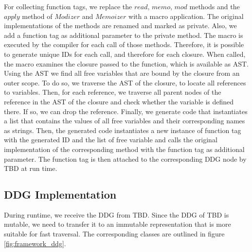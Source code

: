 For collecting function tags, we replace the $read$, $memo$, $mod$ methods and the $apply$ method of $Modizer$ and $Memoizer$ with a macro application. The original implementations of the methods are renamed and marked as private. Also, we add a function tag as additional parameter to the private method. The macro is executed by the compiler for each call of those methods. Therefore, it is possible to generate unique IDs for each call, and therefore for each closure. When called, the macro examines the closure passed to the function, which is available as AST. Using the AST we find all free variables that are bound by the closure from an outer scope. To do so, we traverse the AST of the closure, to locate all references to variables. Then, for each reference, we traverse all parent nodes of the reference in the AST of the closure and check whether the variable is defined there. If so, we can drop the reference. Finally, we generate code that instantiates a list that contains the values of all free variables and their corresponding names as strings. Then, the generated code instantiates a new instance of function tag with the generated ID and the list of free variable and calls the original implementation of the corresponding method with the function tag as additional parameter. The function tag is then attached to the corresponding DDG node by TBD at run time. 

\subsection{DDG Implementation}

During runtime, we receive the DDG from TBD. Since the DDG of TBD is mutable, we need to transfer it to an immutable representation that is more suitable for fast traversal. The corresponding classes are outlined in figure \ref{fig:framework_ddg}. 

